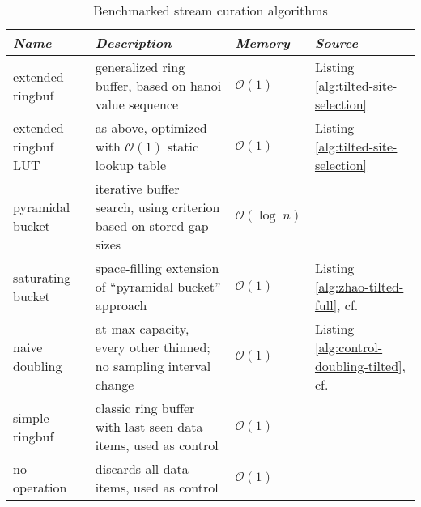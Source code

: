 \begin{table*}[]
\begin{tabular}{llll}
\hline
\textit{Name}
& \textit{Description}
& \textit{Memory}
& \textit{Source}
\\ \hline \hline
extended ringbuf  & generalized ring buffer, based on hanoi value sequence & $\mathcal{O}(1)$ & Listing \ref{alg:tilted-site-selection} \\
extended ringbuf LUT  & as above, optimized with $\mathcal{O}(1)$ static lookup table & $\mathcal{O}(1)$ & Listing \ref{alg:tilted-site-selection} \\
pyramidal bucket     & iterative buffer search, using criterion based on stored gap sizes & $\mathcal{O}(\log \; n )$ & \citep[Fig.~10]{zhao2005generalized} \\
saturating bucket  & space-filling extension of ``pyramidal bucket'' approach & $\mathcal{O}(1)$ & Listing \ref{alg:zhao-tilted-full}, cf. \citep{zhao2005generalized} \\
naive doubling & at max capacity, every other thinned; no sampling interval change & $\mathcal{O}(1)$ & Listing \ref{alg:control-doubling-tilted}, cf. \citep{gunther2014algorithm} \\ \hline
simple ringbuf & classic ring buffer with last seen data items, used as control & $\mathcal{O}(1)$ & \\
no-operation & discards all data items, used as control & $\mathcal{O}(1)$ & \\
\end{tabular}
\caption{Benchmarked stream curation algorithms}
\label{tab:algorithms}
\end{table*}
